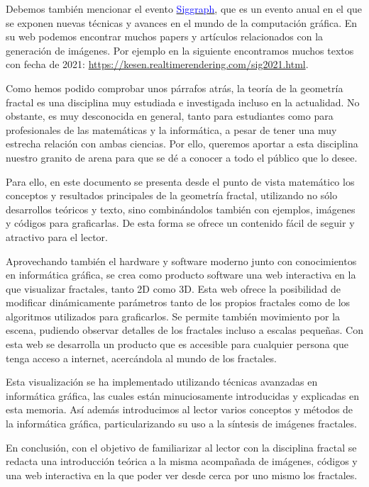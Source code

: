 Debemos también mencionar el evento \href{https://s2022.siggraph.org/}{\textcolor{blue}{Siggraph}}, que es un evento anual en el que se exponen nuevas técnicas y avances en el mundo de la computación gráfica. En su web podemos encontrar muchos papers y artículos relacionados con la generación de imágenes. Por ejemplo en la siguiente encontramos muchos textos con fecha de 2021: \url{https://kesen.realtimerendering.com/sig2021.html}.

Como hemos podido comprobar unos párrafos atrás, la teoría de la geometría fractal es una disciplina muy estudiada e investigada incluso en la actualidad. No obstante, es muy desconocida en general, tanto para estudiantes como para profesionales de las matemáticas y la informática, a pesar de tener una muy estrecha relación con ambas ciencias. Por ello, queremos aportar a esta disciplina nuestro granito de arena para que se dé a conocer a todo el público que lo desee. 

Para ello, en este documento se presenta desde el punto de vista matemático los conceptos y resultados principales de la geometría fractal, utilizando no sólo desarrollos teóricos y texto, sino combinándolos también con ejemplos, imágenes y códigos para graficarlas. De esta forma se ofrece un contenido fácil de seguir y atractivo para el lector. 

Aprovechando también el hardware y software moderno junto con conocimientos en informática gráfica, se crea como producto software una web interactiva en la que visualizar fractales, tanto 2D como 3D. Esta web ofrece la posibilidad de modificar dinámicamente parámetros tanto de los propios fractales como de los algoritmos utilizados para graficarlos. Se permite también movimiento por la escena, pudiendo observar detalles de los fractales incluso a escalas pequeñas. Con esta web se desarrolla un producto que es accesible para cualquier persona que tenga acceso a internet, acercándola al mundo de los fractales.

Esta visualización se ha implementado utilizando técnicas avanzadas en informática gráfica, las cuales están minuciosamente introducidas y explicadas en esta memoria. Así además introducimos al lector varios conceptos y métodos de la informática gráfica, particularizando su uso a la síntesis de imágenes fractales.

En conclusión, con el objetivo de familiarizar al lector con la disciplina fractal se redacta una introducción teórica a la misma acompañada de imágenes, códigos y una web interactiva en la que poder ver desde cerca por uno mismo los fractales.

